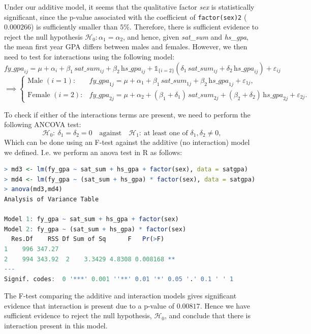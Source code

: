 \documentclass[]{article}
\begin{document}
\noindent Under our additive model, it seems that the qualitative factor \textit{sex} is statistically significant, since the p-value associated with the coefficient of \texttt{factor(sex)2} ($0.000266$) is sufficiently smaller than $5\%$. Therefore, there is sufficient evidence to reject the null hypothesis $\mathcal{H}_0 : \alpha_1 = \alpha_2$, and hence, given \textit{sat\_sum} and \textit{hs\_gpa}, the mean first year GPA differs between males and females. However, we then need to test for interactions using the following model:
\[
\textit{fy\_gpa}_{ij}
= \mu+\alpha_i
+ \beta_1\,\textit{sat\_sum}_{ij}
+ \beta_2\,\textit{hs\_gpa}_{ij}
+ \mathds{1}_{\{i=2\}}\left(\delta_1\,\textit{sat\_sum}_{ij}
+ \delta_2\,\textit{hs\_gpa}_{ij}\right)
+ \varepsilon_{ij}
\]
\[\implies 
\begin{cases}
\text{Male }(i=1): &
\textit{fy\_gpa}_{1j}
= \mu+\alpha_1
+ \beta_1\,\textit{sat\_sum}_{1j}
+ \beta_2\,\textit{hs\_gpa}_{1j}
+ \varepsilon_{1j},\\[6pt]
\text{Female }(i=2): &
\textit{fy\_gpa}_{2j}
= \mu+\alpha_2
+ (\beta_1+\delta_1)\,\textit{sat\_sum}_{2j}
+ (\beta_2+\delta_2)\,\textit{hs\_gpa}_{2j}
+ \varepsilon_{2j}.
\end{cases}
\]

\noindent To check if either of the interactions terms are present, we need to perform the following ANCOVA test:
\[
\mathcal{H}_0:\ \delta_1=\delta_2=0 
\quad\text{against}\quad 
\mathcal{H}_1:\ \text{at least one of }\delta_1,\delta_2\neq 0,
\]
Which can be done using an F-test against the additive (no interaction) model we defined. I.e. we perform an anova test in \textsf{R} as follows:
\begin{lstlisting}[language=R]
> md3 <- lm(fy_gpa ~ sat_sum + hs_gpa + factor(sex), data = satgpa)
> md4 <- lm(fy_gpa ~ (sat_sum + hs_gpa) * factor(sex), data = satgpa)
> anova(md3,md4)
Analysis of Variance Table

Model 1: fy_gpa ~ sat_sum + hs_gpa + factor(sex)
Model 2: fy_gpa ~ (sat_sum + hs_gpa) * factor(sex)
  Res.Df    RSS Df Sum of Sq      F   Pr(>F)   
1    996 347.27                                
2    994 343.92  2    3.3429 4.8308 0.008168 **
---
Signif. codes:  0 '***' 0.001 ''**' 0.01 '*' 0.05 '.' 0.1 ' ' 1
\end{lstlisting}

\noindent The F-test comparing the additive and interaction models gives significant evidence that interaction is present due to a p-value of $0.00817$. Hence we have sufficient evidence to reject the null hypothesis, $\mathcal{H}_0$, and conclude that there is interaction present in this model. \newline
\end{document}
